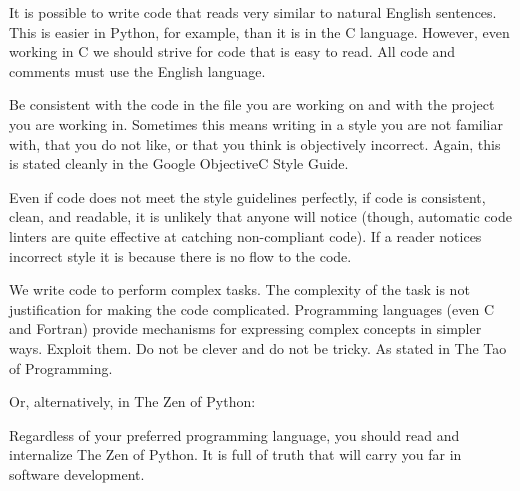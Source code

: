 It is possible to write code that reads very similar to natural English sentences.  This is easier in Python, for example, than it is in the C language.  However, even working in C we should strive for code that is easy to read.  All code and comments must use the English language.

Be consistent with the code in the file you are working on and with the project you are working in.  Sometimes this means writing in a style you are not familiar with, that you do not like, or that you think is objectively incorrect.  Again, this is stated cleanly in the Google ObjectiveC Style Guide\cite{GoogleDevelopers2018}.
    
    
Even if code does not meet the style guidelines perfectly, if code is consistent, clean, and readable, it is unlikely that anyone will notice (though, automatic code linters are quite effective at catching non-compliant code).  If a reader notices incorrect style it is because there is no flow to the code.

We write code to perform complex tasks.  The complexity of the task is not justification for making the code complicated.  Programming languages (even C and Fortran) provide mechanisms for expressing complex concepts in simpler ways.  Exploit them.  Do not be clever and do not be tricky.  As stated in The Tao of Programming\cite{Witters2005}.

    
Or, alternatively, in The Zen of Python\cite{Peters2004}:

    
Regardless of your preferred programming language, you should read and internalize The Zen of Python.  It is full of truth that will carry you far in software development.

